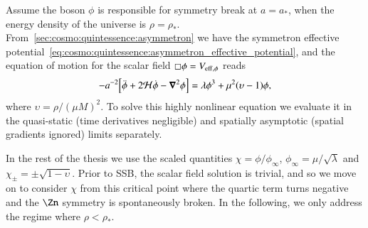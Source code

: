 


\newcommand{\eqregimenum}{\ALIASeqregimenum}
\newcommand{\brchi}{\breve{\chi}}


Assume the boson $\phi$ is responsible for symmetry break at $a=a_\ast$, when the energy density of the universe is $\rho=\rho_\ast$. %
From~\cref{sec:cosmo:quintessence:asymmetron} we have the symmetron effective potential~\cref{eq:cosmo:quintessence:asymmetron_effective_potential}, and the equation of motion for the scalar field $\sq \phi=V_{\mathrm{eff},\phi}$ reads
\begin{equation}
    -a^{-2} {\left[  \ddot{\phi} + 2\mathcal{H} \dot{\phi} - \boldsymbol{\nabla}^2\phi  \right]} = \lambda \phi^3 +\mu^2 {\left(  \upsilon-1 \right)}\phi,
\end{equation}
where $\upsilon=\rho/(\mu M)^2$. %
To solve this highly nonlinear equation we evaluate it in the quasi-static (time derivatives negligible) and spatially asymptotic (spatial gradients ignored) limits separately. 


In the rest of the thesis we use the scaled quantities $\chi=\phi/\phi_\infty$, $\phi_\infty=\mu/\sqrt{\lambda}$ and $\chi_\pm=\pm\sqrt{1-\upsilon}$. Prior to SSB, the scalar field solution is trivial, and so we move on to consider $\chi$ from this critical point where the quartic term turns negative and the $\Zn$ symmetry is spontaneously broken. In the following, we only address the regime where $\rho< \rho_\ast$.













